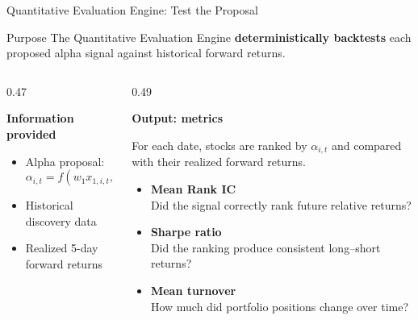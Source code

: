 \documentclass[10pt,aspectratio=169]{beamer}
\begin{document}
\begin{frame}{Quantitative Evaluation Engine: Test the Proposal}

\small

\begin{block}{Purpose}
The Quantitative Evaluation Engine \textbf{deterministically backtests}
each proposed alpha signal against historical forward returns.
\end{block}

\vspace{0.15cm}

\begin{columns}[T,onlytextwidth]

\begin{column}{0.47\textwidth}

\textbf{Information provided}

\begin{itemize}
    \item Alpha proposal: \[\alpha_{i,t} = f\!\left( w_1x_{1,i,t}, w_2x_{2,i,t} \right) \]

    \item Historical discovery data

    \item Realized 5-day forward returns
\end{itemize}

\vspace{0.15cm}

\end{column}

\begin{column}{0.49\textwidth}

\textbf{Output: metrics}

\vspace{0.1cm}

For each date, stocks are ranked by
$\alpha_{i,t}$ and compared with their
realized forward returns.

\vspace{0.15cm}

\begin{itemize}
    \item \textbf{Mean Rank IC}\\
    {\scriptsize Did the signal correctly rank future relative returns?}

    \item \textbf{Sharpe ratio}\\
    {\scriptsize Did the ranking produce consistent long--short returns?}

    \item \textbf{Mean turnover}\\
    {\scriptsize How much did portfolio positions change over time?}
\end{itemize}

\vspace{0.1cm}

\end{column}

\end{columns}

\end{frame}
\end{document}
